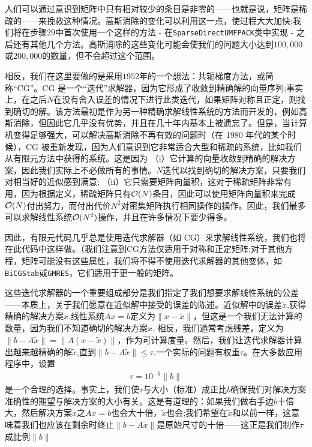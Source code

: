 \documentclass[12pt, a4paper]{article}
\numberwithin{equation}{section} %
\begin{document}
人们可以通过意识到矩阵中只有相对较少的条目是非零的——也就是说，矩阵是稀疏的——来挽救这种情况。高斯消除的变化可以利用这一点，使过程大大加快;我们将在步骤$29$中首次使用一个这样的方法 - 在\verb|SparseDirectUMFPACK|类中实现 - 之后还有其他几个方法。高斯消除的这些变化可能会使我们的问题大小达到$100,000$或$200,000$的数量，但不会超过这个范围。

相反，我们在这里要做的是采用$1952$年的一个想法：共轭梯度方法，或简称“CG”。CG 是一个“迭代”求解器，因为它形成了收敛到精确解的向量序列;事实上，在之后$N$在没有舍入误差的情况下进行此类迭代，如果矩阵对称且正定，则找到确切的解。该方法最初是作为另一种精确求解线性系统的方法而开发的，例如高斯消除，但因此它几乎没有优势，并且在几十年内基本上被遗忘了。但是，当计算机变得足够强大，可以解决高斯消除不再有效的问题时（在 1980 年代的某个时候），CG 被重新发现，因为人们意识到它非常适合大型和稀疏的系统，比如我们从有限元方法中获得的系统。这是因为
（i）它计算的向量收敛到精确的解决方案，因此我们实际上不必做所有的事情。$N$迭代以找到确切的解决方案，只要我们对相当好的近似感到满意;
（ii）它只需要矩阵向量积，这对于稀疏矩阵非常有用，因为根据定义，稀疏矩阵只有${\cal O}(N)
$条目，因此可以使用矩阵向量积来完成${\cal O}(N)$付出努力，而付出代价$N^2$对密集矩阵执行相同操作的操作。因此，我们最多可以求解线性系统${\cal O}(N^2)$操作，并且在许多情况下要少得多。

因此，有限元代码几乎总是使用迭代求解器（如 CG）来求解线性系统，我们也将在此代码中这样做。（我们注意到CG方法仅适用于对称和正定矩阵;对于其他方程，矩阵可能没有这些属性，我们将不得不使用迭代求解器的其他变体，如\verb|BiCGStab|或\verb|GMRES|，它们适用于更一般的矩阵。

这些迭代求解器的一个重要组成部分是我们指定了我们想要求解线性系统的公差——本质上，关于我们愿意在近似解中接受的误差的陈述。近似解中的误差$\tilde x$,获得精确的解决方案$x$.线性系统$Ax=b$定义为$\|x-\tilde x\|$，但这是一个我们无法计算的数量，因为我们不知道确切的解决方案$x$.
相反，我们通常考虑残差，定义为$\|b-A\tilde x\|=\|A(x-\tilde x)\|$，作为可计算度量。然后，我们让迭代求解器计算出越来越精确的解$\tilde x$,直到$\|b-A\tilde x\|\le \tau$.一个实际的问题有权重$\tau$。在大多数应用程序中，设置
\begin{align*} \tau = 10^{-6} \|b\| \end{align*}
是一个合理的选择。事实上，我们使$\tau$与大小（标准）成正比$b$确保我们对解决方案准确性的期望与解决方案的大小有关。这是有道理的：如果我们做右手边$b$十倍大，然后解决方案$x$之$Ax=b$也会大十倍，$\tilde x$也会;我们希望在$\tilde x$和以前一样，这意味着我们也应该在剩余时终止$\|b-A\tilde x\|$是原始尺寸的十倍——这正是我们制作$\tau$成比例$\|b\|$
\end{document}
